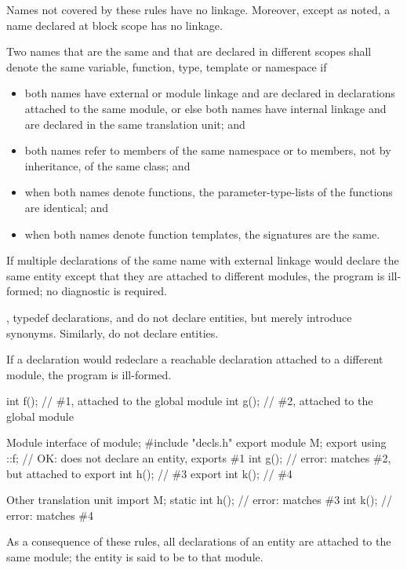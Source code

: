 \pnum
{}%
Names not covered by these rules have no linkage. Moreover, except as
noted, a name declared at block scope has no
linkage.

\pnum
Two names that are the same and that are declared
in different scopes shall denote the same variable, function,
type, template or namespace if
\begin{itemize}
\item both names have external or module linkage
and are declared in declarations attached to the same module,
or else both names have internal linkage
and are declared in the same translation unit; and

\item both names refer to members of the same namespace or to members,
not by inheritance, of the same class; and

\item when both names denote functions, the parameter-type-lists of the
functions are identical; and

\item when both names denote function templates, the
signatures are the same.
\end{itemize}
If multiple declarations of the same name with external linkage
would declare the same entity except that
they are attached to different modules,
the program is ill-formed; no diagnostic is required.
\begin{note}
,
typedef declarations,
and 
do not declare entities, but merely introduce synonyms.
Similarly,
do not declare entities.
\end{note}

\pnum
If a declaration would redeclare a reachable declaration
attached to a different module, the program is ill-formed.
\begin{example}
\begin{codeblocktu}{}
int f();            // \#1, attached to the global module
int g();            // \#2, attached to the global module
\end{codeblocktu}

\begin{codeblocktu}{Module interface of }
module;
#include "decls.h"
export module M;
export using ::f;   // OK: does not declare an entity, exports \#1
int g();            // error: matches \#2, but attached to 
export int h();     // \#3
export int k();     // \#4
\end{codeblocktu}

\begin{codeblocktu}{Other translation unit}
import M;
static int h();     // error: matches \#3
int k();            // error: matches \#4
\end{codeblocktu}
\end{example}
As a consequence of these rules,
all declarations of an entity are attached to the same module;
the entity is said to be  to that module.

